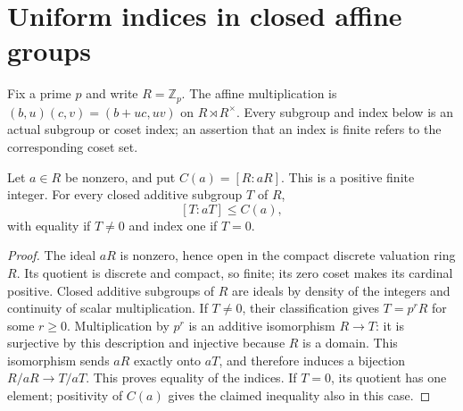 \section{Uniform indices in closed affine groups}

Fix a prime $p$ and write $R=\mathbb Z_p$. The affine multiplication
is $(b,u)(c,v)=(b+uc,uv)$ on $R\rtimes R^\times$. Every subgroup
and index below is an actual subgroup or coset index; an assertion
that an index is finite refers to the corresponding coset set.

\begin{lemma}
\label{ft:uniform-scalar-index}
\leanok
Let $a\in R$ be nonzero, and put $C(a)=[R:aR]$. This is a positive
finite integer. For every closed additive subgroup $T$ of $R$,
\[
 [T:aT]\leq C(a),
\]
with equality if $T\ne0$ and index one if $T=0$.
\end{lemma}
\begin{proof}
The ideal $aR$ is nonzero, hence open in the compact discrete valuation
ring $R$. Its quotient is discrete and compact, so finite; its zero
coset makes its cardinal positive. Closed additive subgroups of $R$
are ideals by density of the integers and continuity of scalar
multiplication. If $T\ne0$, their classification gives $T=p^rR$ for
some $r\geq0$. Multiplication by $p^r$ is an additive isomorphism
$R\longrightarrow T$: it is surjective by this description and
injective because $R$ is a domain. This isomorphism sends $aR$
exactly onto $aT$, and therefore induces a bijection
$R/aR\longrightarrow T/aT$. This proves equality of the indices.
If $T=0$, its quotient has one element; positivity of $C(a)$ gives
the claimed inequality also in this case.
\end{proof}

